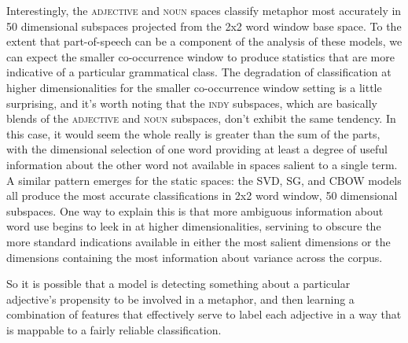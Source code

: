 Interestingly, the \textsc{adjective} and \textsc{noun} spaces classify metaphor most accurately in 50 dimensional subspaces projected from the 2x2 word window base space.  To the extent that part-of-speech can be a component of the analysis of these models, we can expect the smaller co-occurrence window to produce statistics that are more indicative of a particular grammatical class.  The degradation of classification at higher dimensionalities for the smaller co-occurrence window setting is a little surprising, and it's worth noting that the \textsc{indy} subspaces, which are basically blends of the \textsc{adjective} and \textsc{noun} subspaces, don't exhibit the same tendency.  In this case, it would seem the whole really is greater than the sum of the parts, with the dimensional selection of one word providing at least a degree of useful information about the other word not available in spaces salient to a single term.  A similar pattern emerges for the static spaces: the \textsc{SVD}, \textsc{SG}, and \textsc{CBOW} models all produce the most accurate classifications in 2x2 word window, 50 dimensional subspaces.  One way to explain this is that more ambiguous information about word use begins to leek in at higher dimensionalities, servining to obscure the more standard indications available in either the most salient dimensions or the dimensions containing the most information about variance across the corpus.



So it is possible that a model is detecting something about a particular adjective's propensity to be involved in a metaphor, and then learning a combination of features that effectively serve to label each adjective in a way that is mappable to a fairly reliable classification.


